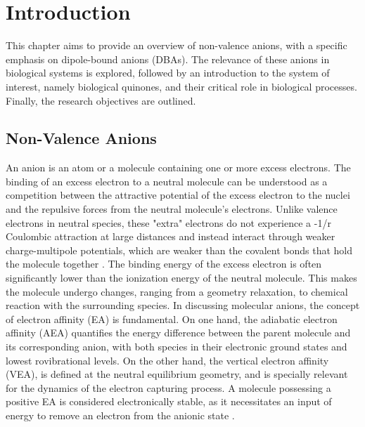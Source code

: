 \chapter{Introduction}\label{ch:introduction}

This chapter aims to provide an overview of non-valence anions, with a specific emphasis on dipole-bound anions (DBAs). The relevance of these anions in biological systems is explored, followed by an introduction to the system of interest, namely biological quinones, and their critical role in biological processes. Finally, the research objectives are outlined.

\section{Non-Valence Anions}
An anion is an atom or a molecule containing one or more excess electrons. 
The binding of an excess electron to a neutral molecule can be understood as a competition between the attractive potential of the excess electron to the nuclei and the repulsive forces from the neutral molecule's electrons. Unlike valence electrons in neutral species, these "extra" electrons do not experience a -1/r Coulombic attraction at large distances and instead interact through weaker charge-multipole potentials, which are weaker than the covalent bonds that hold the molecule together \cite{simons2008molecular, herbert2015quantum}.
The binding energy of the excess electron is often significantly lower than the ionization energy of the neutral molecule. This makes the molecule undergo changes, ranging from a geometry relaxation, to chemical reaction with the surrounding species.
In discussing molecular anions, the concept of electron affinity (EA) is fundamental. On one hand, the adiabatic electron affinity (AEA) quantifies the energy difference between the parent molecule and its corresponding anion, with both species in their electronic ground states and lowest rovibrational levels. On the other hand, the vertical electron affinity (VEA), is defined at the neutral equilibrium geometry, and is specially relevant for the dynamics of the electron capturing process. A molecule possessing a positive EA is considered electronically stable, as it necessitates an input of energy to remove an electron from the anionic state \cite{simons2008molecular}.

